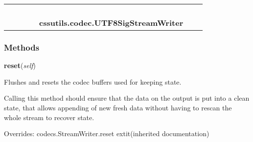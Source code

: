    \label{cssutils:codec:UTF8SigStreamWriter}
\begin{tabular}{cccccccc}
\multicolumn{2}{r}{\settowidth{\BCL}{codecs.Codec}\multirow{2}{\BCL}{codecs.Codec}}
&&
&&
  \\\cline{3-3}
  &&\multicolumn{1}{c|}{}
&&
&&
  \\
\multicolumn{4}{r}{\settowidth{\BCL}{codecs.StreamWriter}\multirow{2}{\BCL}{codecs.StreamWriter}}
&&
  \\\cline{5-5}
  &&&&\multicolumn{1}{c|}{}
&&
  \\
&&&&\multicolumn{2}{l}{\textbf{cssutils.codec.UTF8SigStreamWriter}}
\end{tabular}



  \subsubsection{Methods}

    \vspace{0.5ex}

\hspace{.8\funcindent}\begin{boxedminipage}{\funcwidth}

    \raggedright \textbf{reset}(\textit{self})

\setlength{\parskip}{2ex}
    Flushes and resets the codec buffers used for keeping state.

    Calling this method should ensure that the data on the output is put 
    into a clean state, that allows appending of new fresh data without 
    having to rescan the whole stream to recover state.

\setlength{\parskip}{1ex}
      Overrides: codecs.StreamWriter.reset 	extit{(inherited documentation)}

    \end{boxedminipage}

    \vspace{0.5ex}

